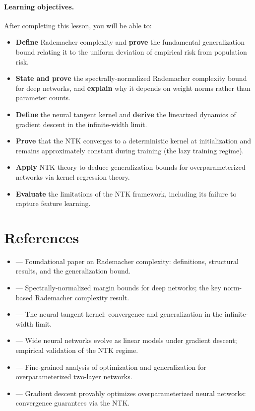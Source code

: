 \documentclass[11pt,a4paper]{article}
\begin{document}
\paragraph{Learning objectives.}
After completing this lesson, you will be able to:
\begin{itemize}[nosep]
  \item \textbf{Define} Rademacher complexity and \textbf{prove} the
    fundamental generalization bound relating it to the uniform
    deviation of empirical risk from population risk.
  \item \textbf{State and prove} the spectrally-normalized Rademacher
    complexity bound for deep networks, and \textbf{explain} why it
    depends on weight norms rather than parameter counts.
  \item \textbf{Define} the neural tangent kernel and \textbf{derive}
    the linearized dynamics of gradient descent in the infinite-width
    limit.
  \item \textbf{Prove} that the NTK converges to a deterministic
    kernel at initialization and remains approximately constant
    during training (the lazy training regime).
  \item \textbf{Apply} NTK theory to deduce generalization bounds
    for overparameterized networks via kernel regression theory.
  \item \textbf{Evaluate} the limitations of the NTK framework,
    including its failure to capture feature learning.
\end{itemize}

\section{References}
\label{sec:references}

\begin{itemize}
  \item \citet{bartlett2002} --- Foundational paper on Rademacher
    complexity: definitions, structural results, and the
    generalization bound.
  \item \citet{bartlett2017} --- Spectrally-normalized margin bounds
    for deep networks; the key norm-based Rademacher complexity result.
  \item \citet{jacot2018} --- The neural tangent kernel: convergence
    and generalization in the infinite-width limit.
  \item \citet{lee2019} --- Wide neural networks evolve as linear
    models under gradient descent; empirical validation of the NTK
    regime.
  \item \citet{arora2019} --- Fine-grained analysis of optimization
    and generalization for overparameterized two-layer networks.
  \item \citet{du2019} --- Gradient descent provably optimizes
    overparameterized neural networks: convergence guarantees via
    the NTK.
\end{itemize}
\end{document}
